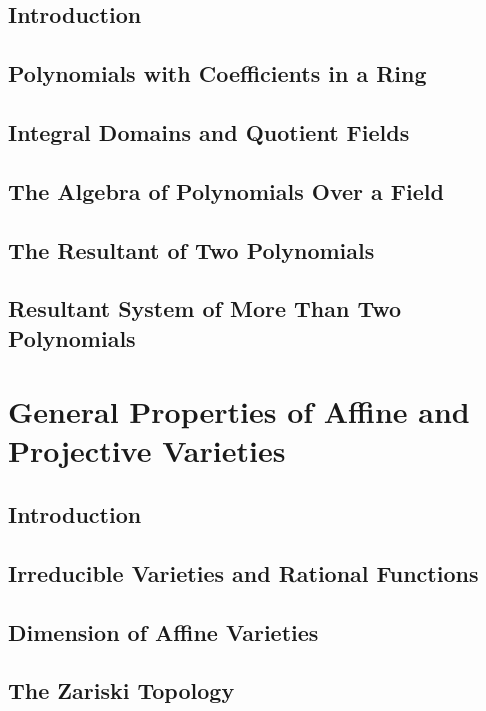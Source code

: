 \documentclass[12pt]{book}
\theoremstyle{plain}
\theoremstyle{definition}
\begin{document}
\section{Introduction}

\section{Polynomials with Coefficients in a Ring}

\section{Integral Domains and Quotient Fields}

\section{The Algebra of Polynomials Over a Field}

\section{The Resultant of Two Polynomials}

\section{Resultant System of More Than Two Polynomials}

\chapter{General Properties of Affine and Projective Varieties}

\section{Introduction}

\section{Irreducible Varieties and Rational Functions}

\section{Dimension of Affine Varieties}

\section{The Zariski Topology}
\end{document}
